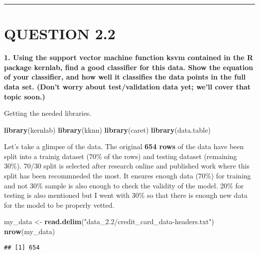 \documentclass[
]{article}
\newenvironment{Shaded}{\begin{snugshade}}{\end{snugshade}}
\newcommand{\KeywordTok}[1]{\textcolor[rgb]{0.13,0.29,0.53}{\textbf{#1}}}
\newcommand{\NormalTok}[1]{#1}
\newcommand{\StringTok}[1]{\textcolor[rgb]{0.31,0.60,0.02}{#1}}
\begin{document}
\begin{center}\rule{0.5\linewidth}{\linethickness}\end{center}

\hypertarget{question-2.2}{%
\section{QUESTION 2.2}\label{question-2.2}}

\textbf{1. Using the support vector machine function ksvm contained in
the R package kernlab, find a good classifier for this data. Show the
equation of your classifier, and how well it classifies the data points
in the full data set. (Don't worry about test/validation data yet; we'll
cover that topic soon.)}

Getting the needed libraries.

\begin{Shaded}
\begin{Highlighting}[]
\KeywordTok{library}\NormalTok{(kernlab)}
\KeywordTok{library}\NormalTok{(kknn)}
\KeywordTok{library}\NormalTok{(caret)}
\KeywordTok{library}\NormalTok{(data.table)}
\end{Highlighting}
\end{Shaded}

Let's take a glimpse of the data. The original \textbf{654 rows} of the
data have been split into a trainig dataset (70\% of the rows) and
testing dataset (remaining 30\%). 70/30 split is selected after research
online and published work where this split has been recommneded the
most. It ensures enough data (70\%) for training and not 30\% sample is
also enough to check the validity of the model. 20\% for testing is also
mentioned but I went with 30\% so that there is enough new data for the
model to be properly vetted.

\begin{Shaded}
\begin{Highlighting}[]
\NormalTok{my_data <-}\StringTok{ }\KeywordTok{read.delim}\NormalTok{(}\StringTok{"data_2.2/credit_card_data-headers.txt"}\NormalTok{)}
\KeywordTok{nrow}\NormalTok{(my_data)}
\end{Highlighting}
\end{Shaded}

\begin{verbatim}
## [1] 654
\end{verbatim}
\end{document}
